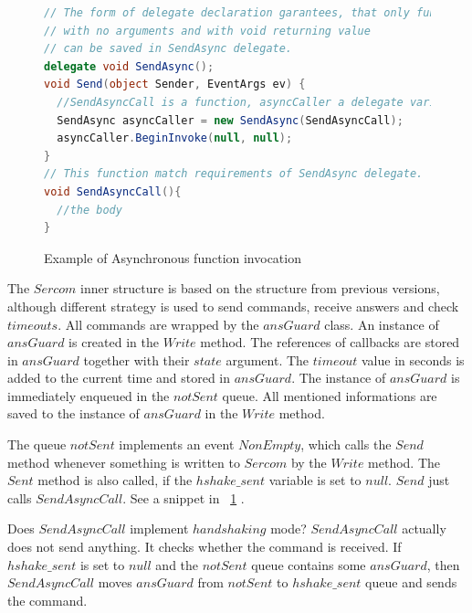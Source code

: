 \begin{figure}[!hbp]
\begin{lstlisting}[language=cs]
// The form of delegate declaration garantees, that only functions
// with no arguments and with void returning value 
// can be saved in SendAsync delegate.
delegate void SendAsync();
void Send(object Sender, EventArgs ev) {
  //SendAsyncCall is a function, asyncCaller a delegate variable
  SendAsync asyncCaller = new SendAsync(SendAsyncCall);
  asyncCaller.BeginInvoke(null, null);      
}
// This function match requirements of SendAsync delegate.
void SendAsyncCall(){
  //the body
}
\end{lstlisting}
\caption{Example of Asynchronous function invocation}\label{invocation}
\end{figure}


  The $Sercom$ inner structure is based on the structure from previous versions, although
  different strategy is used to send commands, receive answers and check $timeouts$.
  All commands are wrapped by the $ansGuard$ class. An instance of $ansGuard$ is created in the $Write$ method.
  The references of callbacks are stored in $ansGuard$ together with their $state$ argument.  
  The $timeout$ value in seconds is added to the current time and stored in $ansGuard$.
  The instance of $ansGuard$ is immediately enqueued in the $notSent$ queue.
  All mentioned informations are saved to the instance of $ansGuard$ in the $Write$ method.

  The queue $notSent$ implements an event $NonEmpty$, which calls the $Send$ method whenever something is written
  to $Sercom$ by the $Write$ method. The $Sent$ method is also called, if the $hshake\_sent$ variable is set to $null$.
  $Send$ just calls $SendAsyncCall$. See a snippet in ~\ref{invocation} .

  Does $SendAsyncCall$ implement $handshaking$ mode?
  $SendAsyncCall$ actually does not send anything. It checks whether the command is received. 
  If $hshake\_sent$ is set to $null$ and the $notSent$ queue
  contains some $ansGuard$, then $SendAsyncCall$ moves $ansGuard$ from $notSent$ to $hshake\_sent$
  queue and sends the command. 

